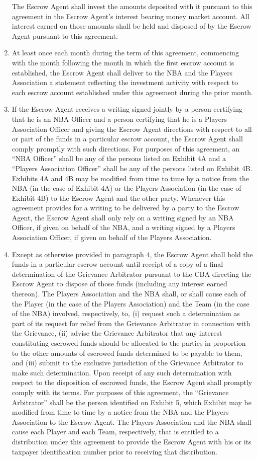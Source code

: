 \documentclass[
]{book}
\begin{document}
\begin{enumerate}
  The Escrow Agent shall invest the amounts deposited with it pursuant to this agreement in the Escrow Agent's interest bearing money market account. All interest earned on those amounts shall be held and disposed of by the Escrow Agent pursuant to this agreement.
\item
  At least once each month during the term of this agreement, commencing with the month following the month in which the first escrow account is established, the Escrow Agent shall deliver to the NBA and the Players Association a statement reflecting the investment activity with respect to each escrow account established under this agreement during the prior month.
\item
  If the Escrow Agent receives a writing signed jointly by a person certifying that he is an NBA Officer and a person certifying that he is a Players Association Officer and giving the Escrow Agent directions with respect to all or part of the funds in a particular escrow account, the Escrow Agent shall comply promptly with such directions. For purposes of this agreement, an ``NBA Officer'' shall be any of the persons listed on Exhibit 4A and a ``Players Association Officer'' shall be any of the persons listed on Exhibit 4B. Exhibits 4A and 4B may be modified from time to time by a notice from the NBA (in the case of Exhibit 4A) or the Players Association (in the case of Exhibit 4B) to the Escrow Agent and the other party. Whenever this agreement provides for a writing to be delivered by a party to the Escrow Agent, the Escrow Agent shall only rely on a writing signed by an NBA Officer, if given on behalf of the NBA, and a writing signed by a Players Association Officer, if given on behalf of the Players Association.
\item
  Except as otherwise provided in paragraph 4, the Escrow Agent shall hold the funds in a particular escrow account until receipt of a copy of a final determination of the Grievance Arbitrator pursuant to the CBA directing the Escrow Agent to dispose of those funds (including any interest earned thereon). The Players Association and the NBA shall, or shall cause each of the Player (in the case of the Players Association) and the Team (in the case of the NBA) involved, respectively, to, (i) request such a determination as part of its request for relief from the Grievance Arbitrator in connection with the Grievance, (ii) advise the Grievance Arbitrator that any interest constituting escrowed funds should be allocated to the parties in proportion to the other amounts of escrowed funds determined to be payable to them, and (iii) submit to the exclusive jurisdiction of the Grievance Arbitrator to make such determination. Upon receipt of any such determination with respect to the disposition of escrowed funds, the Escrow Agent shall promptly comply with its terms. For purposes of this agreement, the ``Grievance Arbitrator'' shall be the person identified on Exhibit 5, which Exhibit may be modified from time to time by a notice from the NBA and the Players Association to the Escrow Agent. The Players Association and the NBA shall cause each Player and each Team, respectively, that is entitled to a distribution under this agreement to provide the Escrow Agent with his or its taxpayer identification number prior to receiving that distribution.

\end{enumerate}
\end{document}
